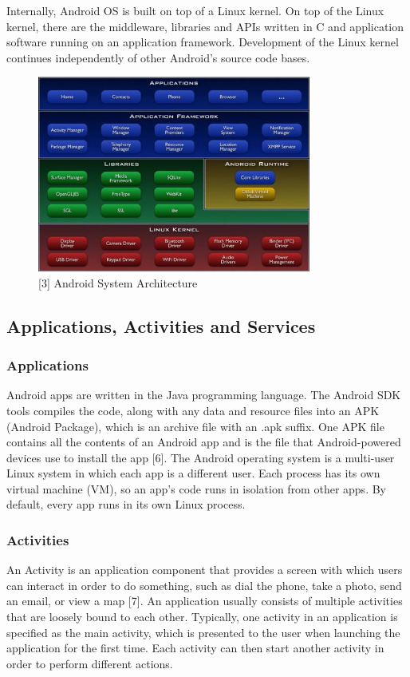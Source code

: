 \documentclass[12pt]{uthesis-v12}  %
\begin{document}
			Internally, Android OS is built on top of a Linux kernel. On top of the Linux kernel, there are the middleware, libraries and APIs written in C and application software running on an application framework. Development of the Linux kernel continues independently of other Android's source code bases.
			
			\begin{figure}[h]
				\centering
				\includegraphics[width = 90mm]{images/androidSystemArchitecture.jpg}
				\caption[Android System Architecture]{[3] Android System Architecture}
			\end{figure}
			
		\subsection{Applications, Activities and Services}
			
			\subsubsection{Applications}
				Android apps are written in the Java programming language. The Android SDK tools compiles the code, along with any data and resource files into an APK (Android Package), which is an archive file with an .apk suffix. One APK file contains all the contents of an Android app and is the file that Android-powered devices use to install the app [6]. The Android operating system is a multi-user Linux system in which each app is a different user. Each process has its own virtual machine (VM), so an app's code runs in isolation from other apps. By default, every app runs in its own Linux process.
				
			\subsubsection{Activities}
				An Activity is an application component that provides a screen with which users can interact in order to do something, such as dial the phone, take a photo, send an email, or view a map [7]. An application usually consists of multiple activities that are loosely bound to each other. Typically, one activity in an application is specified as the main activity, which is presented to the user when launching the application for the first time. Each activity can then start another activity in order to perform different actions.
				
\end{document}
